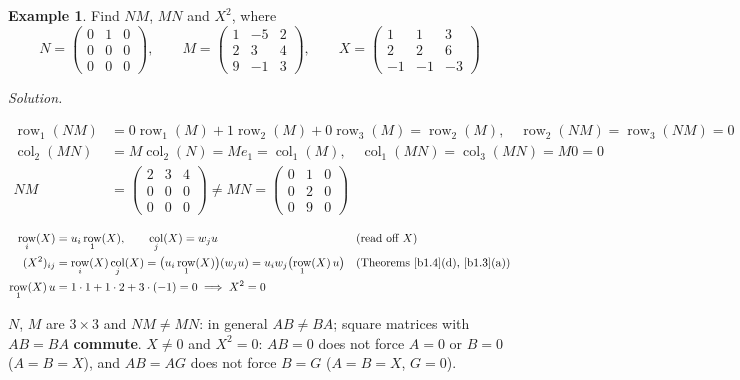 \documentclass[12pt]{article}
\DeclareMathOperator{\col}{col}
\theoremstyle{definition}
\newtheorem{example}[theorem]{Example}
\newcommand{\boardtop}{\vspace*{-\abovedisplayskip}}
\DeclareMathOperator{\row}{row}
\begin{document}
\begin{example}\label{b1.6}\label{b1.7}
Find \(NM\), \(MN\) and \(X^2\), where
\[
N=\begin{pmatrix}0&1&0\\0&0&0\\0&0&0\end{pmatrix},\qquad
M=\begin{pmatrix}1&-5&2\\2&3&4\\9&-1&3\end{pmatrix},\qquad
X=\begin{pmatrix}1&1&3\\2&2&6\\-1&-1&-3\end{pmatrix}
\]
\end{example}
\textit{Solution.}
\begin{board}
\boardtop
\begin{align*}
\row_1(NM)&=0\row_1(M)+1\row_2(M)+0\row_3(M)=\row_2(M),\quad\row_2(NM)=\row_3(NM)=0\\
\col_2(MN)&=M\col_2(N)=Me_1=\col_1(M),\quad\col_1(MN)=\col_3(MN)=M0=0\\
NM&=\begin{pmatrix}2&3&4\\0&0&0\\0&0&0\end{pmatrix}\ne
MN=\begin{pmatrix}0&1&0\\0&2&0\\0&9&0\end{pmatrix}
\end{align*}
\end{board}
\begin{board}[\(X^2\): \(u=\col_1(X)\) has the entries \(u_1=1\), \(u_2=2\), \(u_3=-1\); \(w_1=1\), \(w_2=1\), \(w_3=3\) are
the entries of \(\row_1(X)\):]
\boardtop
\begin{align*}
\row_i(X)&=u_i\row_1(X),\qquad\col_j(X)=w_ju&&\text{(read off }X\text{)}\\
(X^2)_{ij}&=\row_i(X)\col_j(X)=\bigl(u_i\row_1(X)\bigr)(w_ju)=u_iw_j\bigl(\row_1(X)\,u\bigr)
&&\text{(Theorems~\ref{b1.4}(d), \ref{b1.3}(a))}\\
\row_1(X)\,u&=1\cdot1+1\cdot2+3\cdot(-1)=0\implies X^2=0
\end{align*}
\end{board}
\(N\), \(M\) are \(3\times3\) and \(NM\ne MN\): in general \(AB\ne BA\); square matrices with \(AB=BA\)
\textbf{commute}. \(X\ne0\) and \(X^2=0\): \(AB=0\) does not force \(A=0\) or \(B=0\) (\(A=B=X\)), and \(AB=AG\) does not
force \(B=G\) (\(A=B=X\), \(G=0\)).
\end{document}
